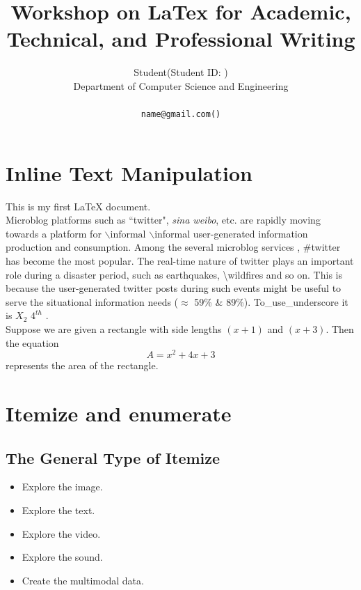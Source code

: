 \documentclass[11pt]{article}
\title{Workshop on LaTex for Academic, Technical, and Professional Writing}
\author{Student(Student ID: )\\
 Department of Computer Science and Engineering\\
 \affaddr{University of Chittagong, Chittagong, Bangladesh}\\
 {\tt name@gmail.com(\Letter)}\\
}
\begin{document}
\maketitle
\pagestyle{plain}

\section{Inline Text Manipulation} %
\label{ref:inlineText} %
This is my first LaTeX document.\\

\noindent Microblog platforms such as ``twitter", \emph{sina weibo}, etc. are rapidly moving towards a platform for $\backslash{\mbox{informal}}$ $\backslash$informal user-generated information production and consumption. Among the several microblog services , \#twitter has become the most popular. The real-time nature of twitter plays an {\color{red} important role during a disaster period}, {\color[HTML]{32a852} such as earthquakes}, \textbackslash{wildfires} and so on. This is because the user-generated twitter posts during such events might be useful to serve the situational information needs ($\approx$ 59\% \& 89\%). To\_use\_underscore it is $X_{2}$ $4^{th}$ . \\

Suppose we are given a rectangle with side lengths $(x+1)$ and $(x+3)$. Then the equation $$A=x^2+4x+3$$ represents the area of the rectangle.\\


\section{Itemize and enumerate}
\label{ref:itemize}

\subsection{The General Type of Itemize}
\begin{itemize}
\item Explore the image.
\item Explore the text.
\item Explore the video.
\item Explore the sound.
\item Create the multimodal data.
\end{itemize}
\end{document}
